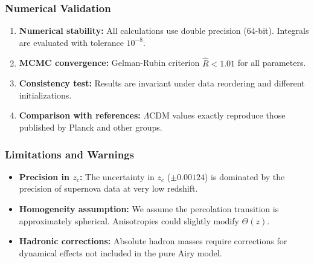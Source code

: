\documentclass[11pt, a4paper]{article}
\theoremstyle{plain}
\theoremstyle{definition}
\begin{document}
\subsubsection{Numerical Validation}
\begin{enumerate}
    \item \textbf{Numerical stability:} All calculations use double precision (64-bit). Integrals are evaluated with tolerance $10^{-8}$.
    
    \item \textbf{MCMC convergence:} Gelman-Rubin criterion $\hat{R} < 1.01$ for all parameters.
    
    \item \textbf{Consistency test:} Results are invariant under data reordering and different initializations.
    
    \item \textbf{Comparison with references:} $\Lambda$CDM values exactly reproduce those published by Planck and other groups.
\end{enumerate}

\subsubsection{Limitations and Warnings}
\begin{itemize}
    \item \textbf{Precision in $z_c$:} The uncertainty in $z_c$ ($\pm 0.00124$) is dominated by the precision of supernova data at very low redshift.
    
    \item \textbf{Homogeneity assumption:} We assume the percolation transition is approximately spherical. Anisotropies could slightly modify $\Theta(z)$.
    
    \item \textbf{Hadronic corrections:} Absolute hadron masses require corrections for dynamical effects not included in the pure Airy model.
\end{itemize}

\end{document}
